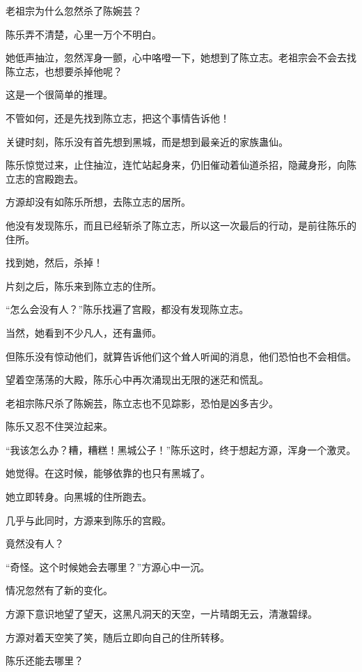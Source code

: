 
\begin{this_body}

老祖宗为什么忽然杀了陈婉芸？

陈乐弄不清楚，心里一万个不明白。

她低声抽泣，忽然浑身一颤，心中咯噔一下，她想到了陈立志。老祖宗会不会去找陈立志，也想要杀掉他呢？

这是一个很简单的推理。

不管如何，还是先找到陈立志，把这个事情告诉他！

关键时刻，陈乐没有首先想到黑城，而是想到最亲近的家族蛊仙。

陈乐惊觉过来，止住抽泣，连忙站起身来，仍旧催动着仙道杀招，隐藏身形，向陈立志的宫殿跑去。

方源却没有如陈乐所想，去陈立志的居所。

他没有发现陈乐，而且已经斩杀了陈立志，所以这一次最后的行动，是前往陈乐的住所。

找到她，然后，杀掉！

片刻之后，陈乐来到陈立志的住所。

“怎么会没有人？”陈乐找遍了宫殿，都没有发现陈立志。

当然，她看到不少凡人，还有蛊师。

但陈乐没有惊动他们，就算告诉他们这个耸人听闻的消息，他们恐怕也不会相信。

望着空荡荡的大殿，陈乐心中再次涌现出无限的迷茫和慌乱。

老祖宗陈尺杀了陈婉芸，陈立志也不见踪影，恐怕是凶多吉少。

陈乐又忍不住哭泣起来。

“我该怎么办？糟，糟糕！黑城公子！”陈乐这时，终于想起方源，浑身一个激灵。

她觉得。在这时候，能够依靠的也只有黑城了。

她立即转身。向黑城的住所跑去。

几乎与此同时，方源来到陈乐的宫殿。

竟然没有人？

“奇怪。这个时候她会去哪里？”方源心中一沉。

情况忽然有了新的变化。

方源下意识地望了望天，这黑凡洞天的天空，一片晴朗无云，清澈碧绿。

方源对着天空笑了笑，随后立即向自己的住所转移。

陈乐还能去哪里？


\end{this_body}
